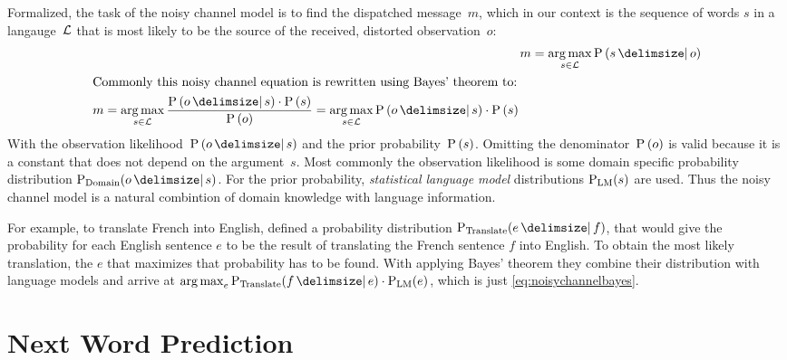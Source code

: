 Formalized, the task of the noisy channel model is to find the dispatched
message~$m$, which in our context is the sequence of words $s$ in a
langauge~$\mathcal{L}$ that is most likely to be the source of the received,
distorted observation~$o$:
\begin{align}
  \label{eq:noisychannel}
  m &= \Argmax_{s \in \Language} \Prob{s}{o} \\
  \intertext{Commonly this noisy channel equation is rewritten using Bayes'
    theorem to:}
  \label{eq:noisychannelbayes}
  \begin{split}
    m &= \Argmax_{s \in \Language} \frac{\Prob{o}{s} \cdot \Prob{s}}{\Prob{o}}
       = \Argmax_{s \in \Language} \Prob{o}{s} \cdot \Prob{s}
  \end{split}
\end{align}
With the observation likelihood~$\Prob{o}{s}$ and the prior
probability~$\Prob{s}$.
Omitting the denominator~$\Prob{o}$ is valid because it is a constant that does
not depend on the argument~$s$.
Most commonly the observation likelihood is some domain specific probability
distribution $\Prob[\text{Domain}]{o}{s}$.
For the prior probability, \emph{statistical language model} distributions
$\Prob[\text{LM}]{s}$ are used.
Thus the noisy channel model is a natural combintion of domain knowledge with
language information.

For example, to translate French into English, \textcite{Brown1990} defined a
probability distribution $\Prob[\text{Translate}]{e}{f}$, that would give the
probability for each English sentence $e$ to be the result of translating
the French sentence $f$ into English.
To obtain the most likely translation, the $e$ that maximizes that probability
has to be found.
With applying Bayes' theorem they combine their distribution with language
models and arrive at
$\Argmax_{e} \Prob[\text{Translate}]{f}{e} \cdot \Prob[\text{LM}]{e}$, which is
just \cref{eq:noisychannelbayes}.

\section{Next Word Prediction}

